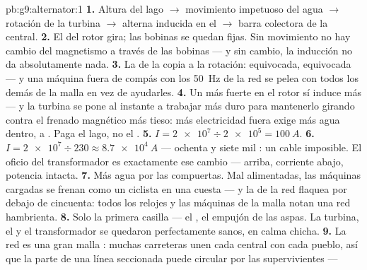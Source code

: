 \begin{solution}{pb:g9:alternator:1}
\textbf{1.} Altura del lago $\to$ movimiento impetuoso del agua $\to$
rotación de la turbina $\to$  alterna inducida en el
 $\to$ barra colectora de la central.
\textbf{2.} El  del rotor gira; las bobinas se quedan fijas. Sin
movimiento no hay cambio del magnetismo a través de las bobinas --- y
sin cambio, la inducción no da absolutamente nada.
\textbf{3.} La  de la  copia a la
rotación:  equivocada, 
equivocada --- y una máquina fuera de compás con los \qty{50}{Hz} de la
red se pelea con todos los demás  de la malla en vez de
ayudarles.
\textbf{4.} Un  más fuerte en el rotor sí induce más --- y la
turbina se pone al instante a trabajar más duro para mantenerlo girando
contra el frenado magnético más tieso: más electricidad fuera exige más
agua dentro,  a . Paga el lago, no el
.
\textbf{5.} $I = \num{2e7} \div \num{2e5} = \qty{100}{A}$.
\textbf{6.} $I = \num{2e7} \div 230 \approx \qty{8.7e4}{A}$ ---
ochenta y siete mil : un cable imposible. El oficio del
transformador es exactamente ese cambio ---  arriba,
corriente abajo, potencia intacta.
\textbf{7.} Más agua por las compuertas. Mal alimentadas, las máquinas
cargadas se frenan como un ciclista en una cuesta --- y la
 de la red flaquea por debajo de cincuenta: todos los
relojes y las máquinas de la malla notan una red hambrienta.
\textbf{8.} Solo la primera casilla --- el , el empujón de
las aspas. La turbina, el  y el transformador se quedaron
perfectamente sanos, en calma chicha.
\textbf{9.} La red es una gran malla : muchas carreteras
unen cada central con cada pueblo, así que la parte de una línea
seccionada puede circular por las  supervivientes ---

\end{solution}
